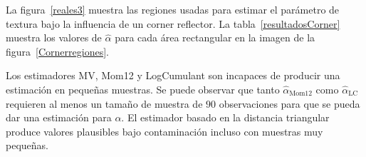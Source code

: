La figura~\ref{reales3} muestra las regiones usadas para estimar el parámetro de textura bajo la influencia de un corner reflector. 
La tabla~\ref{resultadosCorner} muestra los valores de  $\widehat{\alpha}$ para cada área rectangular en la imagen de la figura~\ref{Cornerregiones}.

Los estimadores MV, Mom12 y LogCumulant son incapaces de producir una estimación en pequeñas muestras.  Se puede observar que tanto $\widehat\alpha_{\text{Mom12}}$ como $\widehat\alpha_{\text{LC}}$ requieren al menos un tamaño de muestra de $90$ observaciones para que se pueda dar una estimación para $\alpha$. El estimador basado en la distancia triangular produce valores plausibles bajo contaminación incluso con muestras muy pequeñas.

\begin{figure}[htb]
	\centering

\end{figure}
